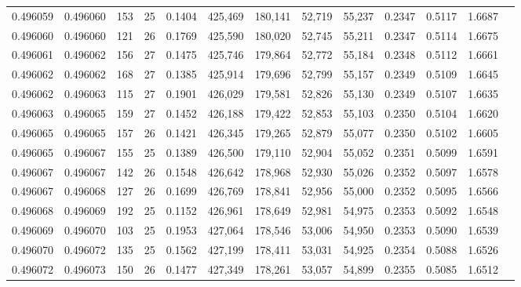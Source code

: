 \begin{tabular}{rrrrrrrrrrrrr}
0.496059 & 0.496060 & 153 &  25 &                                     0.1404 & 425,469 & 180,141 &  52,719 &  55,237 & 0.2347 & 0.5117 & 1.6687 \\
0.496060 & 0.496060 & 121 &  26 &                                     0.1769 & 425,590 & 180,020 &  52,745 &  55,211 & 0.2347 & 0.5114 & 1.6675 \\
0.496061 & 0.496062 & 156 &  27 &                                     0.1475 & 425,746 & 179,864 &  52,772 &  55,184 & 0.2348 & 0.5112 & 1.6661 \\
0.496062 & 0.496062 & 168 &  27 &                                     0.1385 & 425,914 & 179,696 &  52,799 &  55,157 & 0.2349 & 0.5109 & 1.6645 \\
0.496062 & 0.496063 & 115 &  27 &                                     0.1901 & 426,029 & 179,581 &  52,826 &  55,130 & 0.2349 & 0.5107 & 1.6635 \\
0.496063 & 0.496065 & 159 &  27 &                                     0.1452 & 426,188 & 179,422 &  52,853 &  55,103 & 0.2350 & 0.5104 & 1.6620 \\
0.496065 & 0.496065 & 157 &  26 &                                     0.1421 & 426,345 & 179,265 &  52,879 &  55,077 & 0.2350 & 0.5102 & 1.6605 \\
0.496065 & 0.496067 & 155 &  25 &                                     0.1389 & 426,500 & 179,110 &  52,904 &  55,052 & 0.2351 & 0.5099 & 1.6591 \\
0.496067 & 0.496067 & 142 &  26 &                                     0.1548 & 426,642 & 178,968 &  52,930 &  55,026 & 0.2352 & 0.5097 & 1.6578 \\
0.496067 & 0.496068 & 127 &  26 &                                     0.1699 & 426,769 & 178,841 &  52,956 &  55,000 & 0.2352 & 0.5095 & 1.6566 \\
0.496068 & 0.496069 & 192 &  25 &                                     0.1152 & 426,961 & 178,649 &  52,981 &  54,975 & 0.2353 & 0.5092 & 1.6548 \\
0.496069 & 0.496070 & 103 &  25 &                                     0.1953 & 427,064 & 178,546 &  53,006 &  54,950 & 0.2353 & 0.5090 & 1.6539 \\
0.496070 & 0.496072 & 135 &  25 &                                     0.1562 & 427,199 & 178,411 &  53,031 &  54,925 & 0.2354 & 0.5088 & 1.6526 \\
0.496072 & 0.496073 & 150 &  26 &                                     0.1477 & 427,349 & 178,261 &  53,057 &  54,899 & 0.2355 & 0.5085 & 1.6512 \\

\end{tabular}
